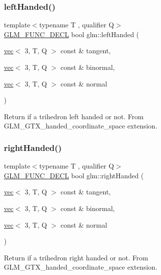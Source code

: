\subsubsection{\texorpdfstring{left\+Handed()}{leftHanded()}}
{\footnotesize\ttfamily template$<$typename T , qualifier Q$>$ \\
\mbox{\hyperlink{setup_8hpp_ab2d052de21a70539923e9bcbf6e83a51}{G\+L\+M\+\_\+\+F\+U\+N\+C\+\_\+\+D\+E\+CL}} bool glm\+::left\+Handed (\begin{DoxyParamCaption}\item[{\mbox{\hyperlink{structglm_1_1vec}{vec}}$<$ 3, T, Q $>$ const \&}]{tangent,  }\item[{\mbox{\hyperlink{structglm_1_1vec}{vec}}$<$ 3, T, Q $>$ const \&}]{binormal,  }\item[{\mbox{\hyperlink{structglm_1_1vec}{vec}}$<$ 3, T, Q $>$ const \&}]{normal }\end{DoxyParamCaption})}

Return if a trihedron left handed or not. From G\+L\+M\+\_\+\+G\+T\+X\+\_\+handed\+\_\+coordinate\+\_\+space extension. \mbox{\label{group__gtx__handed__coordinate__space_ga99386a5ab5491871b947076e21699cc8}} 
\subsubsection{\texorpdfstring{right\+Handed()}{rightHanded()}}
{\footnotesize\ttfamily template$<$typename T , qualifier Q$>$ \\
\mbox{\hyperlink{setup_8hpp_ab2d052de21a70539923e9bcbf6e83a51}{G\+L\+M\+\_\+\+F\+U\+N\+C\+\_\+\+D\+E\+CL}} bool glm\+::right\+Handed (\begin{DoxyParamCaption}\item[{\mbox{\hyperlink{structglm_1_1vec}{vec}}$<$ 3, T, Q $>$ const \&}]{tangent,  }\item[{\mbox{\hyperlink{structglm_1_1vec}{vec}}$<$ 3, T, Q $>$ const \&}]{binormal,  }\item[{\mbox{\hyperlink{structglm_1_1vec}{vec}}$<$ 3, T, Q $>$ const \&}]{normal }\end{DoxyParamCaption})}

Return if a trihedron right handed or not. From G\+L\+M\+\_\+\+G\+T\+X\+\_\+handed\+\_\+coordinate\+\_\+space extension. 